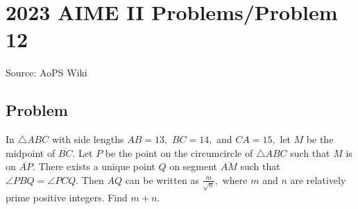 \documentclass[12pt]{article}
\begin{document}
\section*{{2023 AIME II Problems/Problem 12}}
Source: AoPS Wiki

\subsection*{Problem}
In $\triangle ABC$ with side lengths $AB = 13,$ $BC = 14,$ and $CA = 15,$ let $M$ be the midpoint of $\overline{BC}.$ Let $P$ be the point on the circumcircle of $\triangle ABC$ such that $M$ is on $\overline{AP}.$ There exists a unique point $Q$ on segment $\overline{AM}$ such that $\angle PBQ = \angle PCQ.$ Then $AQ$ can be written as $\frac{m}{\sqrt{n}},$ where $m$ and $n$ are relatively prime positive integers. Find $m+n.$
\end{document}
